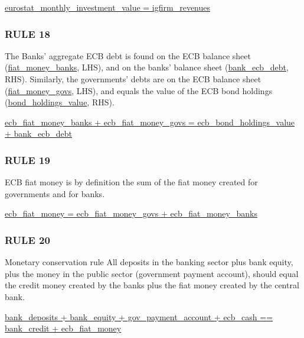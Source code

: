 \bigskip
\url{eurostat_monthly_investment_value = igfirm_revenues}

\subsubsection*{RULE 18}
The Banks' aggregate ECB debt is found on the ECB balance sheet (\url{fiat_money_banks}, LHS), and on the banks' balance sheet (\url{bank_ecb_debt}, RHS). Similarly, the governments' debts are on the ECB balance sheet (\url{fiat_money_govs}, LHS), and equals the value of the ECB bond holdings (\url{bond_holdings_value}, RHS).

\bigskip
\url{ecb_fiat_money_banks + ecb_fiat_money_govs = ecb_bond_holdings_value + bank_ecb_debt}

\subsubsection*{RULE 19}
ECB fiat money is by definition the sum of the fiat money created for governments and for banks.

\bigskip
\url{ecb_fiat_money = ecb_fiat_money_govs + ecb_fiat_money_banks}

\subsubsection*{RULE 20}
Monetary conservation rule
All deposits in the banking sector plus bank equity, plus the money in the public sector (government payment account), 
should equal the credit money created by the banks plus the fiat money created by the central bank.

\bigskip
\url{bank_deposits + bank_equity + gov_payment_account + ecb_cash == bank_credit + ecb_fiat_money}
